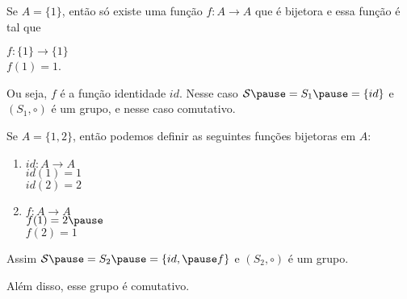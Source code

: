 \documentclass{beamer}
\begin{document}
    \begin{frame}
        Se $A = \{1\}$, \pause ent\~ao s\'o existe uma fun\c{c}\~ao $f : A \to A$ \pause que \'e bijetora e essa fun\c{c}\~ao \'e tal que \pause
        \begin{center}
            $f : \{1\} \to \{1\}$ \pause\\
            $f(1) = 1$. \pause
        \end{center}
        Ou seja, $f$ \'e a fun\c{c}\~ao identidade $id$. \pause Nesse caso $\mathcal{S} \pause = S_1 \pause = \{id\}$ \pause e $(S_1, \circ)$ \'e um grupo, \pause e nesse caso comutativo. \pause
    \end{frame}

    \begin{frame}
        Se $A = \{1, 2\}$, \pause ent\~ao podemos definir as seguintes fun\c{c}\~oes bijetoras em $A$: \pause
        \begin{multicols}{2}
            \begin{enumerate}
                \item[] \begin{center}
                    $id : A \to A$ \pause\\
                    $id(1) = 1$ \pause\\ \vspace{.3cm} $id(2) = 2$
                \end{center}\pause
                \item[]  \begin{center}
                    $f : A \to A$ \pause\\ $f(1) = 2 \pause$\\ \vspace{.3cm}  $f(2) = 1$
                \end{center}\pause
            \end{enumerate}
        \end{multicols}

        Assim $\mathcal{S} \pause = S_2 \pause = \{id, \pause f\}$ \pause e $(S_2, \circ)$ \'e um grupo.\pause

        Al\'em disso, esse grupo \'e comutativo.
    \end{frame}
\end{document}

